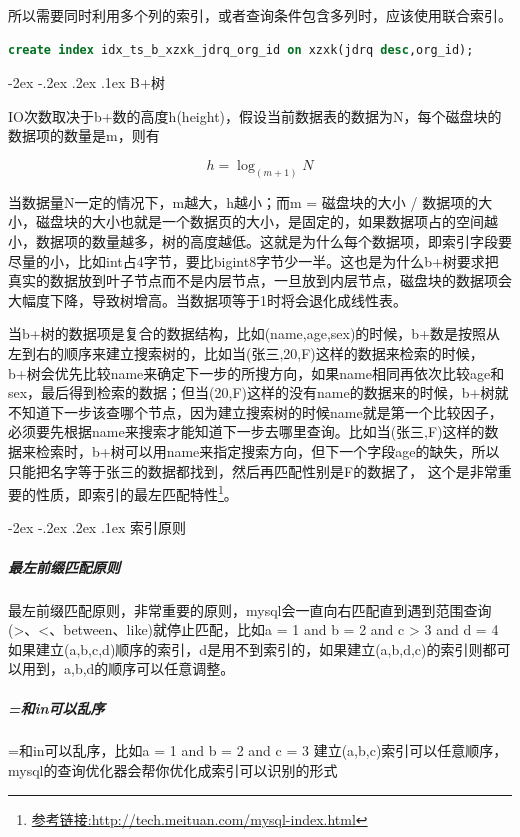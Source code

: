\documentclass[11pt,fleqn]{book}
\makeatletter
\numberwithin{dummy}{section}
\theoremstyle{ocrenumbox}
\theoremstyle{blacknumex}
\theoremstyle{blacknumbox}
\theoremstyle{ocrenum}
\renewcommand\paragraph{\@startsection{paragraph}{4}{\z@}
	{-2ex \@plus-.2ex \@minus .2ex}
	{.1ex}
	{\normalfont\small\sffamily\bfseries}}
\makeatother
\begin{document}
所以需要同时利用多个列的索引，或者查询条件包含多列时，应该使用联合索引。

\begin{lstlisting}[language=SQL]
create index idx_ts_b_xzxk_jdrq_org_id on xzxk(jdrq desc,org_id);
\end{lstlisting}

\paragraph{B+树}

IO次数取决于b+数的高度h(height)，假设当前数据表的数据为N，每个磁盘块的数据项的数量是m，则有

\begin{equation}
h=\log_{(m+1)} N
\end{equation}


当数据量N一定的情况下，m越大，h越小；而m = 磁盘块的大小 / 数据项的大小，磁盘块的大小也就是一个数据页的大小，是固定的，如果数据项占的空间越小，数据项的数量越多，树的高度越低。这就是为什么每个数据项，即索引字段要尽量的小，比如int占4字节，要比bigint8字节少一半。这也是为什么b+树要求把真实的数据放到叶子节点而不是内层节点，一旦放到内层节点，磁盘块的数据项会大幅度下降，导致树增高。当数据项等于1时将会退化成线性表。

当b+树的数据项是复合的数据结构，比如(name,age,sex)的时候，b+数是按照从左到右的顺序来建立搜索树的，比如当(张三,20,F)这样的数据来检索的时候，b+树会优先比较name来确定下一步的所搜方向，如果name相同再依次比较age和sex，最后得到检索的数据；但当(20,F)这样的没有name的数据来的时候，b+树就不知道下一步该查哪个节点，因为建立搜索树的时候name就是第一个比较因子，必须要先根据name来搜索才能知道下一步去哪里查询。比如当(张三,F)这样的数据来检索时，b+树可以用name来指定搜索方向，但下一个字段age的缺失，所以只能把名字等于张三的数据都找到，然后再匹配性别是F的数据了， 这个是非常重要的性质，即索引的最左匹配特性\footnote{\url{参考链接:http://tech.meituan.com/mysql-index.html}}。

\paragraph{索引原则}

\subparagraph{最左前缀匹配原则}最左前缀匹配原则，非常重要的原则，mysql会一直向右匹配直到遇到范围查询(>、<、between、like)就停止匹配，比如a = 1 and b = 2 and c > 3 and d = 4 如果建立(a,b,c,d)顺序的索引，d是用不到索引的，如果建立(a,b,d,c)的索引则都可以用到，a,b,d的顺序可以任意调整。

\subparagraph{=和in可以乱序}=和in可以乱序，比如a = 1 and b = 2 and c = 3 建立(a,b,c)索引可以任意顺序，mysql的查询优化器会帮你优化成索引可以识别的形式
\end{document}

